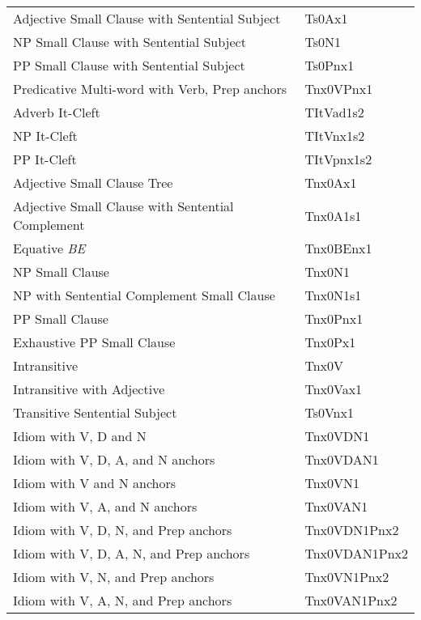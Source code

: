 \begin{tabular}{ll}
Adjective Small Clause with Sentential Subject & Ts0Ax1\\
NP Small Clause with Sentential Subject &  Ts0N1\\
PP Small Clause with Sentential Subject & Ts0Pnx1\\
Predicative Multi-word with Verb, Prep anchors & Tnx0VPnx1\\
Adverb It-Cleft & TItVad1s2\\
NP It-Cleft & TItVnx1s2\\
PP It-Cleft & TItVpnx1s2\\
Adjective Small Clause Tree & Tnx0Ax1\\
Adjective Small Clause with Sentential Complement & Tnx0A1s1\\
Equative {\it BE} & Tnx0BEnx1\\
NP Small Clause & Tnx0N1\\
NP with Sentential Complement Small Clause & Tnx0N1s1\\
PP Small Clause & Tnx0Pnx1\\
Exhaustive PP Small Clause & Tnx0Px1\\
Intransitive & Tnx0V\\
Intransitive with Adjective & Tnx0Vax1\\
Transitive Sentential Subject &  Ts0Vnx1\\
Idiom with V, D and N & Tnx0VDN1\\
Idiom with V, D, A, and N anchors & Tnx0VDAN1\\
Idiom with V and N anchors & Tnx0VN1\\
Idiom with V, A, and N anchors & Tnx0VAN1\\
Idiom with V, D, N, and Prep anchors & Tnx0VDN1Pnx2\\
Idiom with V, D, A, N, and Prep anchors & Tnx0VDAN1Pnx2\\
Idiom with V, N, and Prep anchors & Tnx0VN1Pnx2\\
Idiom with V, A, N, and Prep anchors & Tnx0VAN1Pnx2
\end{tabular}
\normalsize

\clearpage















